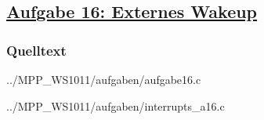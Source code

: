 \subsection
{\href{http://cst.mi.fu-berlin.de/intern/19606-P-MPP/Aufgaben/040503.html}
{Aufgabe 16: Externes Wakeup}}

\subsubsection*{Quelltext}

{../MPP_WS1011/aufgaben/aufgabe16.c}


{../MPP_WS1011/aufgaben/interrupts_a16.c}

